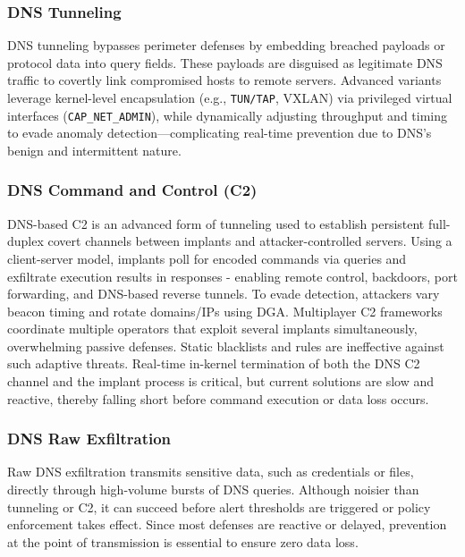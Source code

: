 \documentclass [11pt, proquest] {uwthesis}[2020/02/24]
\begin{document}
\subsubsection{DNS Tunneling}
DNS tunneling bypasses perimeter defenses by embedding breached payloads or protocol data into query fields. These payloads are disguised as legitimate DNS traffic to covertly link compromised hosts to remote servers. Advanced variants leverage kernel-level encapsulation (e.g., \texttt{TUN/TAP}, VXLAN) via privileged virtual interfaces (\texttt{CAP\_NET\_ADMIN}), while dynamically adjusting throughput and timing to evade anomaly detection—complicating real-time prevention due to DNS’s benign and intermittent nature.

\subsubsection{DNS Command and Control (C2)}
DNS-based C2 is an advanced form of tunneling used to establish persistent full-duplex covert channels between implants and attacker-controlled servers. Using a client-server model, implants poll for encoded commands via queries and exfiltrate execution results in responses - enabling remote control, backdoors, port forwarding, and DNS-based reverse tunnels. To evade detection, attackers vary beacon timing and rotate domains/IPs using DGA. Multiplayer C2 frameworks coordinate multiple operators that exploit several implants simultaneously, overwhelming passive defenses. Static blacklists and rules are ineffective against such adaptive threats. Real-time in-kernel termination of both the DNS C2 channel and the implant process is critical, but current solutions are slow and reactive, thereby falling short before command execution or data loss occurs.

\subsubsection{DNS Raw Exfiltration}
Raw DNS exfiltration transmits sensitive data, such as credentials or files, directly through high-volume bursts of DNS queries. Although noisier than tunneling or C2, it can succeed before alert thresholds are triggered or policy enforcement takes effect. Since most defenses are reactive or delayed, prevention at the point of transmission is essential to ensure zero data loss.
\end{document}
